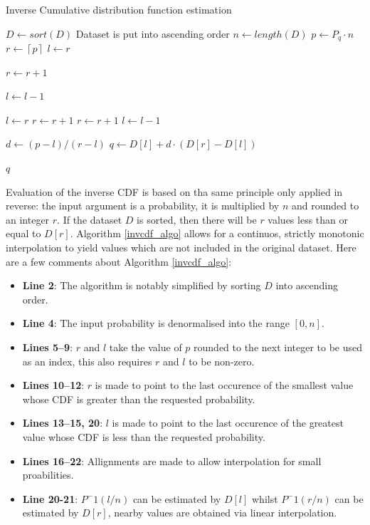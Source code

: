 \documentclass[10pt,final]{siamltex}
\begin{document}
\begin{algorithm}
  \caption{Inverse Cumulative distribution function estimation}
  \label{invcdf_algo}
  \begin{algorithmic}[1]
    \State $D \gets sort(D)$
    \Comment Dataset is put into ascending order
    \State $n \gets length(D)$
    \State $p \gets P_q \cdot n$
    \State $r \gets  \left \lceil{p}\right \rceil$
    \EndIf
    \State $l \gets r$

    \State $ r \gets r + 1$
    \EndWhile

    \State $l \gets l - 1$
    \EndWhile

    \State $l \gets r$
    \State $r \gets r+1$
    \State $r \gets r + 1$
    \EndWhile
    \Else
    \State $ l \gets l - 1$
    \EndIf

    \State $d \gets (p-l)/(r-l) $
    \State $q \gets D[l] + d \cdot (D[r]-D[l])$

    \State \Return $q$
    \EndFunction
  \end{algorithmic}
\end{algorithm}

Evaluation of the inverse CDF is based on tha same principle only applied in reverse: the input argument is a probability, it is multiplied by $n$ and rounded to an integer $r$. If the dataset $D$ is sorted, then there will be $r$ values less than or equal to $D[r]$. Algorithm \ref{invcdf_algo} allows for a continuos, strictly monotonic interpolation to yield values which are not included in the original dataset.
Here are a few comments about Algorithm \ref{invcdf_algo}:
\begin{itemize}
  \item \textbf{Line 2}: The algorithm is notably simplified by sorting $D$ into ascending order.
  \item \textbf{Line 4}: The input probability is denormalised into the range $[0, n]$.
  \item \textbf{Lines 5--9}: $r$ and $l$ take the value of $p$ rounded to the next integer to be used as an index, this also requires $r$ and $l$ to be non-zero.
  \item \textbf{Lines 10--12}: $r$ is made to point to the last occurence of the smallest value whose CDF is greater than the requested probability.
  \item \textbf{Lines 13--15, 20}: $l$ is made to point to the last occurence of the greatest value whose CDF is less than the requested probability.
  \item \textbf{Lines 16--22}: Allignments are made to allow interpolation for small proabilities.
  \item \textbf{Line 20-21}: $P^-1(l/n)$ can be estimated by $D[l]$ whilst $P^-1(r/n)$ can be estimated by $D[r]$, nearby values are obtained via linear interpolation.
\end{itemize}
%
\end{document}
